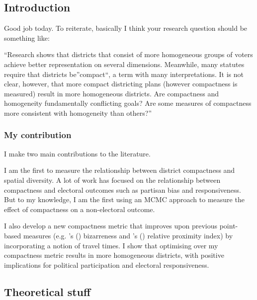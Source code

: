 \documentclass[]{article}
\author{Zhenghong Lieu}
\date{}
\begin{document}
\def\citeapos#1{\citeauthor{#1}'s (\citeyear{#1})}

\hypertarget{introduction}{%
\subsection{Introduction}\label{introduction}}

Good job today. To reiterate, basically I think your research question
should be something like:

``Research shows that districts that consist of more homogeneous groups
of voters achieve better representation on several dimensions.
Meanwhile, many statutes require that districts be''compact``, a term
with many interpretations. It is not clear, however, that more compact
districting plans (however compactness is measured) result in more
homogeneous districts. Are compactness and homogeneity fundamentally
conflicting goals? Are some measures of compactness more consistent with
homogeneity than others?''

\hypertarget{my-contribution}{%
\subsubsection{My contribution}\label{my-contribution}}

I make two main contributions to the literature.

I am the first to measure the relationship between district compactness
and spatial diversity. A lot of work has focused on the relationship
between compactness and electoral outcomes such as partisan bias and
responsiveness. But to my knowledge, I am the first using an MCMC
approach to measure the effect of compactness on a non-electoral
outcome.

I also develop a new compactness metric that improves upon previous
point-based measures (e.g. \citeauthor{cm2010}'s (\citeyear{cm2010})
bizarreness and \citeauthor{fh2011}'s (\citeyear{fh2011}) relative
proximity index) by incorporating a notion of travel times. I show that
optimising over my compactness metric results in more homogeneous
districts, with positive implications for political participation and
electoral responsiveness.

\hypertarget{theoretical-stuff}{%
\subsection{Theoretical stuff}\label{theoretical-stuff}}
\end{document}
